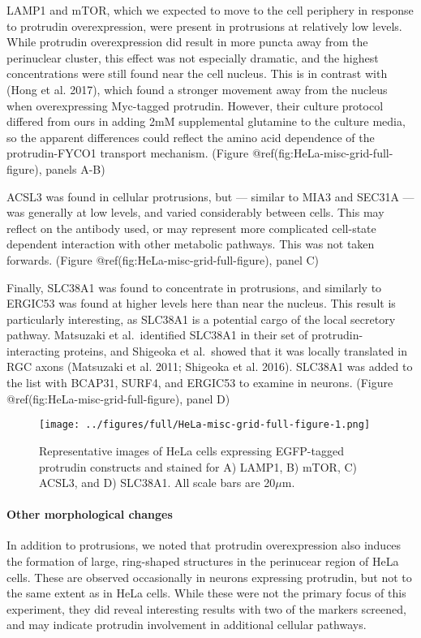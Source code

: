 \documentclass[
]{article}
\begin{document}
LAMP1 and mTOR, which we expected to move to the cell periphery in
response to protrudin overexpression, were present in protrusions at
relatively low levels. While protrudin overexpression did result in more
puncta away from the perinuclear cluster, this effect was not especially
dramatic, and the highest concentrations were still found near the cell
nucleus. This is in contrast with (Hong et al. 2017), which found a
stronger movement away from the nucleus when overexpressing Myc-tagged
protrudin. However, their culture protocol differed from ours in adding
2mM supplemental glutamine to the culture media, so the apparent
differences could reflect the amino acid dependence of the
protrudin-FYCO1 transport mechanism. (Figure
@ref(fig:HeLa-misc-grid-full-figure), panels A-B)

ACSL3 was found in cellular protrusions, but --- similar to MIA3 and
SEC31A --- was generally at low levels, and varied considerably between
cells. This may reflect on the antibody used, or may represent more
complicated cell-state dependent interaction with other metabolic
pathways. This was not taken forwards. (Figure
@ref(fig:HeLa-misc-grid-full-figure), panel C)

Finally, SLC38A1 was found to concentrate in protrusions, and similarly
to ERGIC53 was found at higher levels here than near the nucleus. This
result is particularly interesting, as SLC38A1 is a potential cargo of
the local secretory pathway. Matsuzaki et al.~identified SLC38A1 in
their set of protrudin-interacting proteins, and Shigeoka et al.~showed
that it was locally translated in RGC axons (Matsuzaki et al. 2011;
Shigeoka et al. 2016). SLC38A1 was added to the list with BCAP31, SURF4,
and ERGIC53 to examine in neurons. (Figure
@ref(fig:HeLa-misc-grid-full-figure), panel D)

\begin{figure}
\centering
\texttt{[image: ../figures/full/HeLa-misc-grid-full-figure-1.png]}
\caption{Representative images of HeLa cells expressing EGFP-tagged
protrudin constructs and stained for A) LAMP1, B) mTOR, C) ACSL3, and D)
SLC38A1. All scale bars are 20\(\mu\)m.}
\end{figure}

\hypertarget{other-morphological-changes}{%
\paragraph{Other morphological
changes}\label{other-morphological-changes}}

In addition to protrusions, we noted that protrudin overexpression also
induces the formation of large, ring-shaped structures in the perinucear
region of HeLa cells. These are observed occasionally in neurons
expressing protrudin, but not to the same extent as in HeLa cells. While
these were not the primary focus of this experiment, they did reveal
interesting results with two of the markers screened, and may indicate
protrudin involvement in additional cellular pathways.
\end{document}
